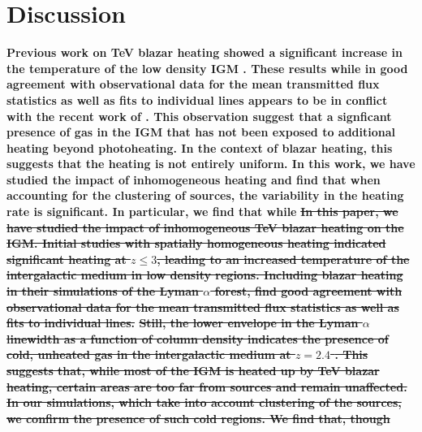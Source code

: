 \documentclass[twocolumns]{emulateapj}
\newcommand\ALc[1]{{\color{red} \bf #1}} %
\newcommand\Pc[1]{{\color{cyan} \bf #1}} %
\begin{document}
\ALc{
\section{Discussion}
}
\Pc{Previous work on TeV blazar heating showed a significant increase in the temperature of the low density IGM \citep{2012ApJ...752...23C,2012MNRAS.423..149P}.  These results while in good agreement with  observational data for the mean transmitted flux statistics as well as fits to individual lines appears to be in conflict with the recent work of \citep{2012ApJ...757L..30R}.  This observation suggest that a signficant presence of gas in the IGM that has not been exposed to additional heating beyond photoheating.  In the context of blazar heating, this suggests that the heating is not entirely uniform.  In this work, we have studied the impact of inhomogeneous heating and find that when accounting for the clustering of sources, the variability in the heating rate is significant.  In particular, we find that while 
}
\Pc{\sout{In this paper, we have studied the impact of inhomogeneous TeV blazar heating on the IGM. Initial studies with spatially homogeneous heating \citep{2012ApJ...752...23C} indicated significant heating at $z\leqslant 3$, leading to an increased temperature of the intergalactic medium in low density regions. Including blazar heating in their simulations of the Lyman $\alpha$ forest, \citet{2012MNRAS.423..149P} find good agreement with observational data for the mean transmitted flux statistics as well as fits to individual lines.}
\sout{
Still, the lower envelope in the Lyman $\alpha$ linewidth as a function of column density indicates the presence of cold, unheated gas in the intergalactic medium at $z=2.4$ \citep{2012ApJ...757L..30R}. This suggests that, while most  of the IGM is heated up by TeV blazar heating, certain areas are too far from sources and remain unaffected.  In our simulations, which take into account clustering of the sources, we confirm the presence of such cold regions.  We find that, though
} 
}
\end{document}
